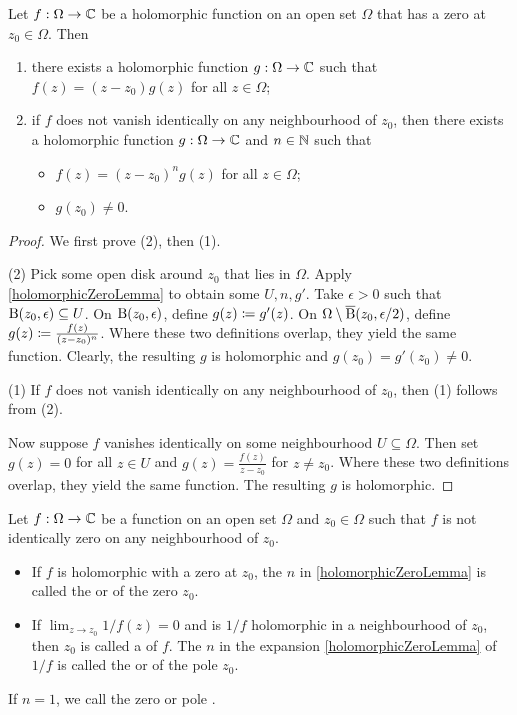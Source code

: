 \begin{lemma} \label{holomorphicZeroFactorisationLemma}
Let $f:\Omega\to \mathbb{C}$ be a holomorphic function on an open set $\Omega$ that has a zero at $z_0\in \Omega$.
Then
\begin{enumerate}
\item there exists a holomorphic function $g: \Omega \to \mathbb{C}$ such that $f(z) = (z-z_0)g(z)$ for all $z\in \Omega$;
\item if $f$ does not vanish identically on any neighbourhood of $z_0$, then there exists a holomorphic function $g: \Omega \to \mathbb{C}$ and $n\in \mathbb{N}$ such that
\begin{itemize}
\item $f(z) = (z-z_0)^ng(z)$ for all $z\in \Omega$;
\item $g(z_0) \neq 0$.
\end{itemize}
\end{enumerate}
\end{lemma}
\begin{proof}
We first prove (2), then (1).

(2) Pick some open disk around $z_0$ that lies in $\Omega$. Apply \ref{holomorphicZeroLemma} to obtain some $U,n,g'$. Take $\epsilon >0$ such that $\operatorname{B}(z_0, \epsilon) \subseteq U$. On $\operatorname{B}(z_0, \epsilon)$, define $g(z) \coloneqq g'(z)$. On $\Omega\setminus\operatorname{\overline{B}}(z_0, \epsilon /2)$, define $g(z) \coloneqq \frac{f(z)}{(z-z_0)^n}$. Where these two definitions overlap, they yield the same function. Clearly, the resulting $g$ is holomorphic and $g(z_0) = g'(z_0) \neq 0$.

(1) If $f$ does not vanish identically on any neighbourhood of $z_0$, then (1) follows from (2).

Now suppose $f$ vanishes identically on some neighbourhood $U\subseteq \Omega$. Then set $g(z) = 0$ for all $z\in U$ and $g(z) = \frac{f(z)}{z-z_0}$ for $z\neq z_0$. Where these two definitions overlap, they yield the same function. The resulting $g$ is holomorphic.
\end{proof}

\begin{definition}
Let $f:\Omega\to \mathbb{C}$ be a function on an open set $\Omega$ and $z_0\in \Omega$ such that $f$ is not identically zero on any neighbourhood of $z_0$.
\begin{itemize}
\item If $f$ is holomorphic with a zero at $z_0$, the $n$ in \ref{holomorphicZeroLemma} is called the  or  of the zero $z_0$.
\item If $\lim_{z\to z_0} 1/f(z) = 0$ and is $1/f$ holomorphic in a neighbourhood of $z_0$, then $z_0$ is called a  of $f$. The $n$ in the expansion \ref{holomorphicZeroLemma} of $1/f$ is called the  or  of the pole $z_0$.
\end{itemize}
If $n = 1$, we call the zero or pole . 
\end{definition}

